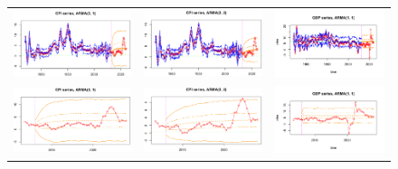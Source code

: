 \documentclass{Configuration_Files/PoliMi3i_thesis}
\begin{document}
\begin{figure}[H]
  \centering
  \begin{tabular}{@{}ccc@{}}
    \includegraphics[angle=270,width=0.3\linewidth]{fARMA(3,1).png} &
    \includegraphics[angle=270,width=0.3\linewidth]{fARMA(2,2).png} &
    \includegraphics[angle=270,width=0.3\linewidth]{fARMA(1,1).png} \\
    \includegraphics[angle=270,width=0.3\linewidth]{zARMA(3,1).png} &
    \includegraphics[angle=270,width=0.3\linewidth]{zARMA(2,2).png} &
    \includegraphics[angle=270,width=0.3\linewidth]{zARMA(1,1).png}
    \end{tabular}
\end{figure}

\newpage
\end{document}
